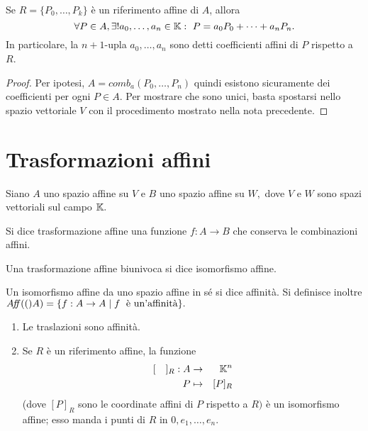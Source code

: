 \documentclass[a4paper,12pt]{article}
\newcommand{\Got}[1]{#1}
\newcommand{\got}[1]{{#1}}
\begin{document}
 \begin{proposition}
 \Got{Se} $\got{R=\{P_0,\dots,P_k\}}$ \Got{è un riferimento affine di} $\got{A}$, \Got{allora}
 \[
	\got{\forall P\in A, \exists ! a_0,\dots,a_n\in \K :\ P=a_0P_0+\dots+a_nP_n.}
 \]
 \Got{In particolare, la} $\got{n+1}$\Got{-upla} $\got{a_0,\dots,a_n}$ \Got{sono detti coefficienti affini di} $\got{P}$
 \Got{rispetto a} $\got{R}$.
 \end{proposition}
 
 \begin{proof}
 \Got{Per ipotesi,} $\got{A=comb_a(P_0,\dots,P_n)}$ \Got{quindi esistono sicuramente dei coefficienti per ogni}
 $\got{P\in A}$. \Got{Per mostrare che sono unici, basta spostarsi nello spazio vettoriale}
 $\got{V}$ \Got{con il procedimento mostrato nella nota precedente.}
 \end{proof}

	\section{Trasformazioni affini}
	
 \Got{Siano} $\got{A}$ \Got{uno spazio affine su} $\got{V}$ \Got{e} $\got{B}$ \Got{uno spazio affine su} $\got{W,}$ \Got{dove} $\got{V}$ \Got{e}
 $\got{W}$ \Got{sono spazi vettoriali sul campo} $\got{\K.}$
 
 \begin{definition}
 \Got{Si dice trasformazione affine una funzione} $\got{f:A\to B}$ \Got{che conserva le combinazioni affini.}
 \end{definition}
 
 \begin{definition}
 \Got{Una trasformazione affine biunivoca si dice isomorfismo affine.}
 \end{definition}
 
 \begin{definition}
 \Got{Un isomorfismo affine da uno spazio affine in sé si dice affinità. Si definisce inoltre}
 $\got{\Aff(A)=\{f:A\to A\;|\; f\; \text{ è un'affinità}\}.}$
 \end{definition}
 
 \begin{esempi}
 \begin{enumerate}[label=\bf\Roman*)]
  \item \Got{Le traslazioni sono affinità.}
  \item \Got{Se} $\got{R}$ \Got{è un riferimento affine, la funzione}
   \begin{eqnarray*}
  \got{[\quad]_R:A} & \to & \got{\K^n} \\
  \got{P} & \mapsto & \got{[P]_R}
 \end{eqnarray*}
  \Got{(dove} $\got{[P]_R}$ \Got{sono le coordinate affini di} $\got{P}$ \Got{rispetto a} $\got{R)}$ \Got{è un isomorfismo affine;
 esso manda i punti di} $\got{R}$ \Got{in} $\got{0,e_1,\ldots,e_n.}$
 \end{enumerate}
 \end{esempi}
 
\end{document}
